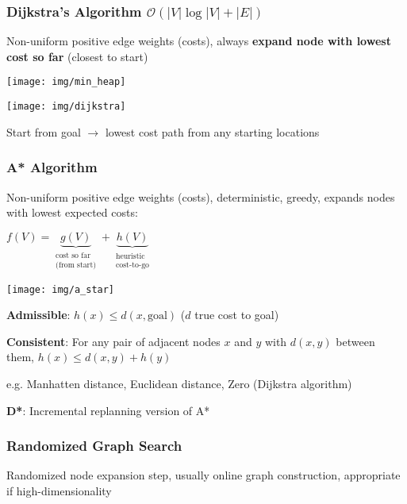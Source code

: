 \documentclass[fontsize=6pt]{scrartcl}
\begin{document}
\begin{multicols*}{4}
\subsubsection*{Dijkstra's Algorithm $\mathcal{O} (|V|\log|V| + |E|)$}
Non-uniform positive edge weights (costs), always \textbf{expand node with lowest cost so far} (closest to start)

\begin{minipage}{0.5\linewidth}
	\texttt{[image: img/min\_heap]}
\end{minipage}
\begin{minipage}{0.5\linewidth}
	\texttt{[image: img/dijkstra]}
\end{minipage}

Start from goal $\rightarrow$ lowest cost path from any starting locations

\subsubsection*{A* Algorithm }


\begin{minipage}{0.55\linewidth}
	Non-uniform positive edge weights (costs), deterministic, greedy, expands nodes with lowest expected costs:

	{\centering
	$f(V) = \underbrace{g(V)}_{\substack{\text{cost so far} \\
			\text{(from start)}}}
	+ \underbrace{h(V)}_{\substack{
			\text{heuristic} \\ \text{cost-to-go}
		}
	}$
	\par}
\end{minipage}
\begin{minipage}{0.45\linewidth}
	\texttt{[image: img/a\_star]}
\end{minipage}

\textbf{Admissible}: $h(x) \leq d(x,\text{goal})$ ($d$ true cost to goal)

\textbf{Consistent}: For any pair of adjacent nodes $x$ and $y$ with $d(x,y)$ between them, $ h(x) \leq d(x,y) + h(y)$


e.g. Manhatten distance, Euclidean distance, Zero (Dijkstra algorithm)

\textbf{D*}: Incremental replanning version of A*

\subsubsection*{Randomized Graph Search}
Randomized node expansion step,	usually online graph construction, appropriate if high-dimensionality


\end{multicols*}
\end{document}
